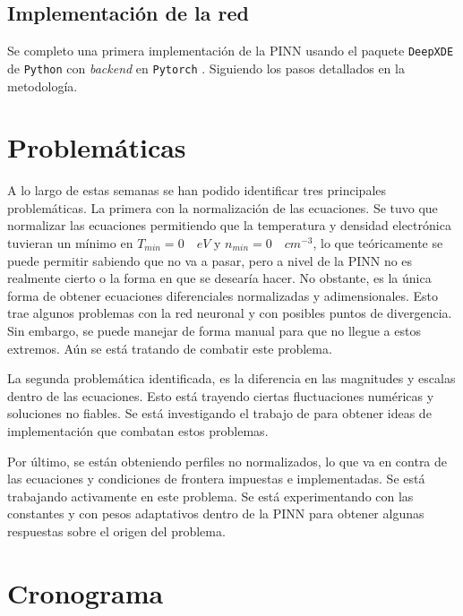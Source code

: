 \subsection{Implementación de la red}

Se completo una primera implementación de la PINN usando el paquete \texttt{DeepXDE} \cite{lu2021} de \texttt{Python} con \textit{backend} en \texttt{Pytorch} \cite{pytorch}. Siguiendo los pasos detallados en la metodología. 

\section{Problemáticas}

A lo largo de estas semanas se han podido identificar tres principales problemáticas. La primera con la normalización de las ecuaciones. Se tuvo que normalizar las ecuaciones permitiendo que la temperatura y densidad electrónica tuvieran un mínimo en $T_{min} = 0 \quad eV$ y $n_{min} = 0 \quad cm^{-3}$, lo que teóricamente se puede permitir sabiendo que no va a pasar, pero a nivel de la PINN no es realmente cierto o la forma en que se desearía hacer. No obstante, es la única forma de obtener ecuaciones diferenciales normalizadas y adimensionales. Esto trae algunos problemas con la red neuronal y con posibles puntos de divergencia. Sin embargo, se puede manejar de forma manual para que no llegue a estos extremos. Aún se está tratando de combatir este problema. 

La segunda problemática identificada, es la diferencia en las magnitudes y escalas dentro de las ecuaciones. Esto está trayendo ciertas fluctuaciones numéricas y soluciones no fiables. Se está investigando el trabajo de \cite{chen2026} para obtener ideas de implementación que combatan estos problemas. 

Por último, se están obteniendo perfiles no normalizados, lo que va en contra de las ecuaciones y condiciones de frontera impuestas e implementadas. Se está trabajando activamente en este problema. Se está experimentando con las constantes y con pesos adaptativos dentro de la PINN para obtener algunas respuestas sobre el origen del problema.
 
\section{Cronograma}

